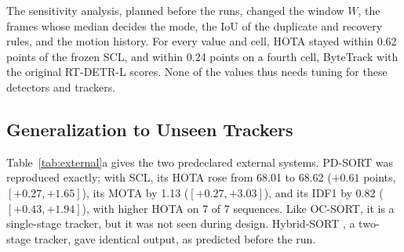 \documentclass[pdflatex,sn-mathphys-num,iicol]{sn-jnl}
\newcommand{\scl}{SCL}
\begin{document}
The sensitivity analysis, planned before the runs, changed the window $W$, the frames whose median
decides the mode, the IoU of the duplicate and recovery rules, and the motion history. For every
value and cell, HOTA stayed within 0.62 points of the frozen \scl{}, and within 0.24 points on a
fourth cell, ByteTrack with the original RT-DETR-L scores. None of the values thus needs tuning for
these detectors and trackers.

\subsection{Generalization to Unseen Trackers}\label{sec:external}
Table~\ref{tab:external}a gives the two predeclared external systems. PD-SORT \cite{wang2025pdsort}
was reproduced exactly; with \scl{}, its HOTA rose from 68.01 to 68.62 ($+0.61$ points,
$[+0.27,+1.65]$), its MOTA by 1.13 ($[+0.27,+3.03]$), and its IDF1 by 0.82 ($[+0.43,+1.94]$), with
higher HOTA on 7 of 7 sequences. Like OC-SORT, it is a single-stage tracker, but it was not seen
during design. Hybrid-SORT \cite{yang2024hybridsort}, a two-stage tracker, gave identical output, as
predicted before the run.
\end{document}
